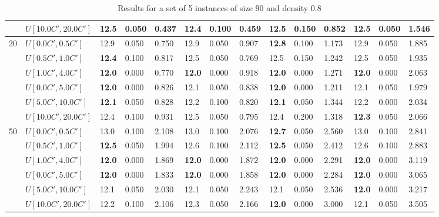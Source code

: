\begin{table}[h]
{\begin{tabular}{|l|l||l|l|l||l|l|l||l|l|l||l|l|l|}
       & $U[10.0C',20.0C']$ & 12.5 & 0.050 & 0.437 & \textbf{12.4} & 0.100 & 0.459 & 12.5 & 0.150 & 0.852 & 12.5 & 0.050 & 1.546 \\
      \hline\hline
      \multirow{6}{*}{20} & $U[0.0C',0.5C']$ & 12.9 & 0.050 & 0.750 & 12.9 & 0.050 & 0.907 & \textbf{12.8} & 0.100 & 1.173 & 12.9 & 0.050 & 1.885 \\
       & $U[0.5C',1.0C']$ & \textbf{12.4} & 0.100 & 0.817 & 12.5 & 0.050 & 0.769 & 12.5 & 0.150 & 1.242 & 12.5 & 0.050 & 1.935 \\
       & $U[1.0C',4.0C']$ & \textbf{12.0} & 0.000 & 0.770 & \textbf{12.0} & 0.000 & 0.918 & \textbf{12.0} & 0.000 & 1.271 & \textbf{12.0} & 0.000 & 2.063 \\
       & $U[0.0C',5.0C']$ & \textbf{12.0} & 0.000 & 0.826 & 12.1 & 0.050 & 0.838 & \textbf{12.0} & 0.000 & 1.211 & 12.1 & 0.050 & 1.979 \\
       & $U[5.0C',10.0C']$ & \textbf{12.1} & 0.050 & 0.828 & 12.2 & 0.100 & 0.820 & \textbf{12.1} & 0.050 & 1.344 & 12.2 & 0.000 & 2.034 \\
       & $U[10.0C',20.0C']$ & 12.4 & 0.100 & 0.931 & 12.5 & 0.050 & 0.795 & 12.4 & 0.200 & 1.318 & \textbf{12.3} & 0.050 & 2.066 \\
      \hline\hline
      \multirow{6}{*}{50} & $U[0.0C',0.5C']$ & 13.0 & 0.100 & 2.108 & 13.0 & 0.100 & 2.076 & \textbf{12.7} & 0.050 & 2.560 & 13.0 & 0.100 & 2.841 \\
       & $U[0.5C',1.0C']$ & \textbf{12.5} & 0.050 & 1.994 & 12.6 & 0.100 & 2.112 & \textbf{12.5} & 0.050 & 2.412 & 12.6 & 0.100 & 2.883 \\
       & $U[1.0C',4.0C']$ & \textbf{12.0} & 0.000 & 1.869 & \textbf{12.0} & 0.000 & 1.872 & \textbf{12.0} & 0.000 & 2.291 & \textbf{12.0} & 0.000 & 3.119 \\
       & $U[0.0C',5.0C']$ & \textbf{12.0} & 0.000 & 1.833 & \textbf{12.0} & 0.000 & 1.858 & \textbf{12.0} & 0.000 & 2.284 & \textbf{12.0} & 0.000 & 3.065 \\
       & $U[5.0C',10.0C']$ & 12.1 & 0.050 & 2.030 & 12.1 & 0.050 & 2.243 & 12.1 & 0.050 & 2.536 & \textbf{12.0} & 0.000 & 3.217 \\
       & $U[10.0C',20.0C']$ & 12.2 & 0.100 & 2.106 & 12.3 & 0.050 & 2.166 & \textbf{12.0} & 0.000 & 3.000 & 12.1 & 0.050 & 3.505 \\
      \hline
      \end{tabular}
      }
      \caption{Results for a set of 5 instances of size $90$ and density $0.8$}
      \label{tab:pcpn90p8}\end{table}


